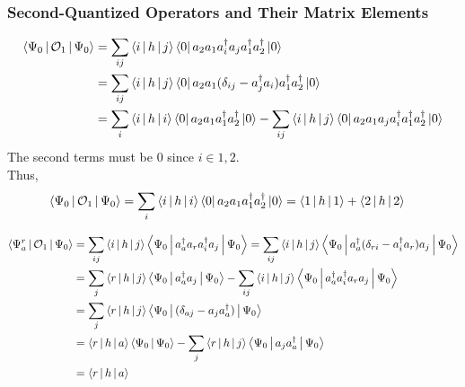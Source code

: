 \documentclass[a4paper]{article}
\begin{document}
\subsubsection{Second-Quantized Operators and Their Matrix Elements}
\begin{equation}\label{key}
\begin{aligned}
\Braket{\Psi_0 | \mathcal{O}_1 | \Psi_0} &= \sum_{ij}\Braket{i|h|j}\Bra{0}a_2 a_1 a_i^\dagger a_j a_1^\dagger a_2^\dagger \ket{0}\\
&= \sum_{ij}\Braket{i|h|j}\Bra{0}a_2 a_1 (\delta_{ij} -  a_j^\dagger a_i) a_1^\dagger a_2^\dagger \ket{0} \\
&= \sum_i\Braket{i|h|i} \Bra{0}a_2 a_1 a_1^\dagger a_2^\dagger \ket{0} - \sum_{ij}\Braket{i|h|j}\Bra{0}a_2 a_1 a_j a_i^\dagger a_1^\dagger  a_2^\dagger \ket{0}
\end{aligned}
\end{equation}
The second terms must be $ 0 $ since $ i\in{1,2} $.\\
Thus,
\begin{equation}\label{key}
\begin{aligned}
\Braket{\Psi_0 | \mathcal{O}_1 | \Psi_0} &= \sum_i\Braket{i|h|i} \Bra{0}a_2 a_1 a_1^\dagger a_2^\dagger \ket{0} = \Braket{1|h|1} +\Braket{2|h|2}
\end{aligned}
\end{equation}

\allowdisplaybreaks
\begin{align}
\Braket{\Psi_a^r | \mathcal{O}_1 | \Psi_0} &= \sum_{ij}\Braket{i|h|j}\Braket{\Psi_0 | a_a^\dagger a_r a_i^\dagger a_j | \Psi_0} = \sum_{ij}\Braket{i|h|j}\Braket{\Psi_0 | a_a^\dagger (\delta_{ri} -  a_i^\dagger a_r) a_j | \Psi_0}\notag\\
&= \sum_j\Braket{r|h|j}\Braket{\Psi_0 | a_a^\dagger a_j|\Psi_0} - \sum_{ij}\Braket{i|h|j}\Braket{\Psi_0 | a_a^\dagger a_i^\dagger a_r a_j | \Psi_0}\notag\\
&= \sum_j\Braket{r|h|j}\Braket{\Psi_0 | (\delta_{aj} - a_j a_a^\dagger)|\Psi_0}\notag\\
&= \Braket{r|h|a}\Braket{\Psi_0 | \Psi_0} - \sum_j\Braket{r|h|j}\Braket{\Psi_0 | a_j a_a^\dagger|\Psi_0}\notag\\
&= \Braket{r|h|a}
\end{align}
\end{document}
